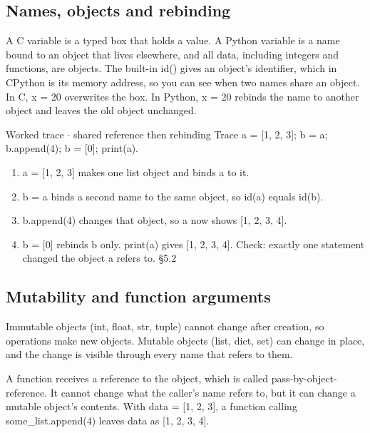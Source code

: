 \documentclass[11pt]{article}
\begin{document}
\begin{keepsection}
\begin{keepsection}
\subsection{Names, objects and rebinding}

A C variable is a typed box that holds a value. A Python variable is a name bound to an object that lives elsewhere, and all data, including integers and functions, are objects. The built-in id() gives an object’s identifier, which in CPython is its memory address, so you can see when two names share an object. In C, x = 20 overwrites the box. In Python, x = 20 rebinds the name to another object and leaves the old object unchanged.

\begin{workedbox}{Worked trace \ensuremath{\cdot} shared reference then rebinding}
Trace a = [1, 2, 3]; b = a; b.append(4); b = [0]; print(a).

\begin{enumerate}
\item a = [1, 2, 3] makes one list object and binds a to it.
\item b = a binds a second name to the same object, so id(a) equals id(b).
\item b.append(4) changes that object, so a now shows [1, 2, 3, 4].
\item b = [0] rebinds b only. print(a) gives [1, 2, 3, 4]. Check: exactly one statement changed the object a refers to. \hfill{\small\color{FAUblue}§5.2}
\end{enumerate}
\end{workedbox}
\end{keepsection}

\begin{keepsection}
\subsection{Mutability and function arguments}

Immutable objects (int, float, str, tuple) cannot change after creation, so operations make new objects. Mutable objects (list, dict, set) can change in place, and the change is visible through every name that refers to them.

A function receives a reference to the object, which is called pass-by-object-reference. It cannot change what the caller’s name refers to, but it can change a mutable object’s contents. With data = [1, 2, 3], a function calling some\_list.append(4) leaves data as [1, 2, 3, 4].
\end{keepsection}


\end{keepsection}
\end{document}
